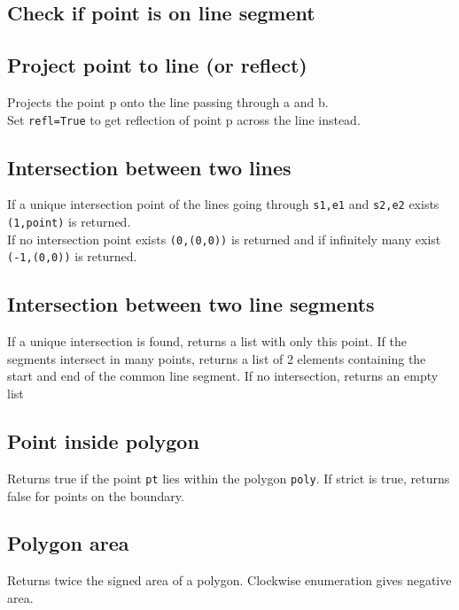 \documentclass{article}
\begin{document}
\subsection*{Check if point is on line segment}


\subsection*{Project point to line (or reflect)}
Projects the point p onto the line passing through a and b.\\
Set \lstinline{refl=True} to get reflection of point p across the line instead.


\subsection*{Intersection between two lines}
If a unique intersection point of the lines going through \lstinline{s1,e1} and \lstinline{s2,e2} exists \lstinline{(1,point)} is returned.\\
If no intersection point exists \lstinline{(0,(0,0))} is returned and if infinitely many exist \lstinline{(-1,(0,0))} is returned.


\subsection*{Intersection between two line segments}
If a unique intersection is found, returns a list with only this point.
If the segments intersect in many points, returns a list of 2 elements containing the
start and end of the common line segment. If no intersection, returns an empty list


\subsection*{Point inside polygon}
Returns true if the point \lstinline{pt} lies within the polygon \lstinline{poly}.
If strict is true, returns false for points on the boundary.


\pagebreak

\subsection*{Polygon area}
Returns twice the signed area of a polygon. Clockwise enumeration gives negative area.

\end{document}
